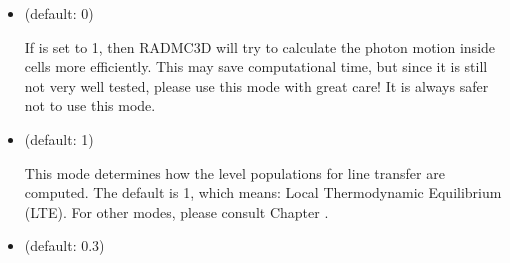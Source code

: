 \documentclass[letterpaper,10pt,english]{sphinxmanual}
\begin{document}
\begin{itemize}
If =1 (default) then in Monte Carlo simulations not
all photon packages will have the same energy (see Section
{\hyperref[\detokenize{dustradtrans:sec-photon-packages-mc}]{}}). The energy will be weighted such that each
star or emission mechanism will emit, on average, the same number of photon
packages. As an example: If you have a stellar binary consisting of an O\sphinxhyphen{}star
surrounded by a Brown Dwarf, but the Brown Dwarf is surrounded by a disk, then
although the O star is much brighter than the O\sphinxhyphen{}star, the very inner regions
of the Brown Dwarf disk is still predominantly heated by the Brown Dwarf
stellar surface, because it is much closer to that material. If you do not
have weighted photon packages, then statistically the Brown Dwarf would emit
perhaps 1 or 2 photon packages, which makes the statistics of the energy
balance in the inner disk very bad. By =1 both the
Brown Dwarf and the O\sphinxhyphen{}star will each emit the same number of photon packages;
just the energy of the photon packages emitted by the Brown Dwarf are much
less energetic than those from the O\sphinxhyphen{}star.  This now assures a good photon
statistics everywhere.

\item {} 
 (default: 0) 

If  is set to 1, then RADMC\sphinxhyphen{}3D will try to
calculate the photon motion inside cells more efficiently. This may
save computational time, but since it is still not very well tested,
please use this mode with great care! It is always safer not to use
this mode.

\item {} 
 (default: 1)

This mode determines how the level populations for line transfer are
computed. The default is 1, which means: Local Thermodynamic Equilibrium
(LTE). For other modes, please consult Chapter {\hyperref[\detokenize{lineradtrans:chap-line-transfer}]{}}.

\item {} 
 (default: 0.3) 


\end{itemize}
\end{document}
